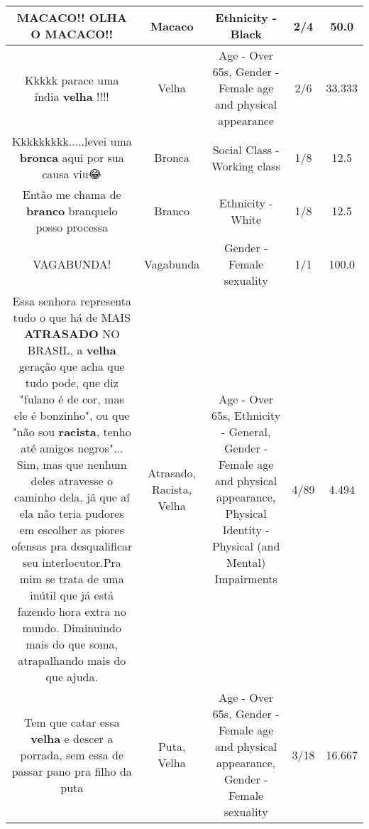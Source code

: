 \documentclass[11pt]{article}
\newlength\mylength
\begin{document}
\begin{center}
\begin{longtable}{|C{.65\mylength}|C{.30\mylength}|C{.12\mylength}|C{.12\mylength}|C{.12\mylength}|}
  \small MACACO!! OLHA O \textbf{MACACO}!!\normalsize   & Macaco & Ethnicity - Black & 2/4 & 50.0 \\  \hline
  \small Kkkkk parace uma índia \textbf{v\textbf{elha}} !!!!\normalsize   & Velha & Age - Over 65s, Gender - Female age and physical appearance & 2/6 & 33.333 \\  \hline
  \small Kkkkkkkkk.....levei uma \textbf{bronca} aqui por sua causa viu😂\normalsize   & Bronca & Social Class - Working class & 1/8 & 12.5 \\  \hline
  \small Então me chama de \textbf{branco} branquelo posso processa\normalsize   & Branco & Ethnicity - White & 1/8 & 12.5 \\  \hline
  \small VAGABUNDA!\normalsize   & Vagabunda & Gender - Female sexuality & 1/1 & 100.0 \\  \hline
  \small Essa senhora representa tudo o que há de MAIS \textbf{ATRASADO} NO BRASIL, a \textbf{v\textbf{elha}} geração que acha que tudo pode, que diz "fulano é de cor, mas ele é bonzinho", ou que "não sou \textbf{racista}, tenho até amigos negros"... Sim, mas que nenhum deles atravesse o caminho dela, já que aí ela não teria pudores em escolher as piores ofensas pra desqualificar seu interlocutor.Pra mim se trata de uma inútil que já está fazendo hora extra no mundo. Diminuindo mais do que soma, atrapalhando mais do que ajuda.\normalsize   & Atrasado, Racista, Velha & Age - Over 65s, Ethnicity - General, Gender - Female age and physical appearance, Physical Identity - Physical (and Mental) Impairments & 4/89 & 4.494 \\  \hline
  \small Tem que catar essa \textbf{v\textbf{elha}} e descer a porrada, sem essa de passar pano pra filho da puta\normalsize   & Puta, Velha & Age - Over 65s, Gender - Female age and physical appearance, Gender - Female sexuality & 3/18 & 16.667 \\  \hline

\end{longtable}
\end{center}
\end{document}

